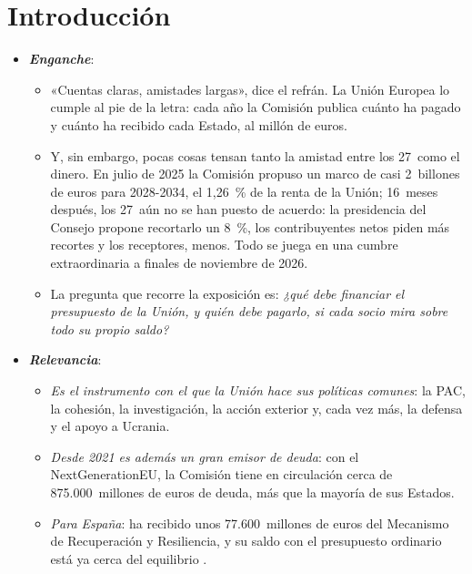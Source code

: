 \documentclass[11pt]{article}
\begin{document}
\tceetitulo


\section*{Introducción}

\begin{itemize}
\item \textbf{\emph{Enganche}}:
  \begin{itemize}
  \item «Cuentas claras, amistades largas», dice el refrán. La Unión Europea lo cumple al pie de la letra: cada año la Comisión publica cuánto ha pagado y cuánto ha recibido cada Estado, al millón de euros.
  \item Y, sin embargo, pocas cosas tensan tanto la amistad entre los 27~como el dinero. En julio de 2025 la Comisión propuso un marco de casi 2~billones de euros para 2028-2034, el 1,26~\% de la renta de la Unión; 16~meses después, los 27~aún no se han puesto de acuerdo: la presidencia del Consejo propone recortarlo un 8~\%, los contribuyentes netos piden más recortes y los receptores, menos. Todo se juega en una cumbre extraordinaria a finales de noviembre de 2026\nocite{EPRS2026MFP}.
  \item La pregunta que recorre la exposición es: \emph{¿qué debe financiar el presupuesto de la Unión, y quién debe pagarlo, si cada socio mira sobre todo su propio saldo?}
  \end{itemize}

\item \textbf{\emph{Relevancia}}:
  \begin{itemize}
  \item \emph{Es el instrumento con el que la Unión hace sus políticas comunes}: la PAC, la cohesión, la investigación, la acción exterior y, cada vez más, la defensa y el apoyo a Ucrania.
  \item \emph{Desde 2021 es además un gran emisor de deuda}: con el NextGenerationEU, la Comisión tiene en circulación cerca de 875.000~millones de euros de deuda, más que la mayoría de sus Estados\nocite{CE2026Emisor}.
  \item \emph{Para España}: ha recibido unos 77.600~millones de euros del Mecanismo de Recuperación y Resiliencia, y su saldo con el presupuesto ordinario está ya cerca del equilibrio\nocite{Gobierno2026PRTR,CE2026GastosIngresos} .
  \end{itemize}


\end{itemize}
\end{document}

